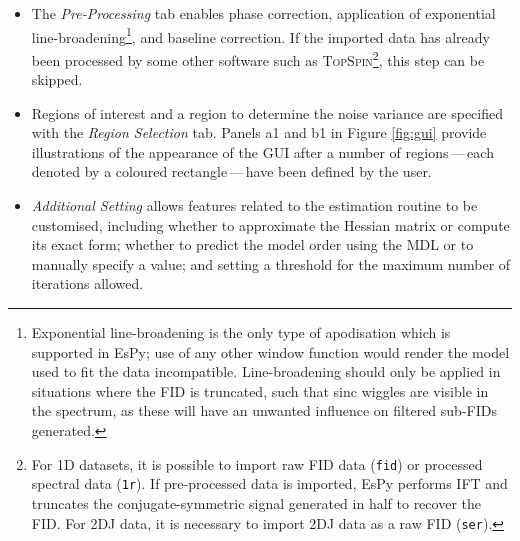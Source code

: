 \begin{itemize}
    \item The \emph{Pre-Processing} tab enables phase correction,
        application of exponential line-broadening\footnote{
            Exponential line-broadening is the only type of apodisation which
            is supported in \ac{EsPy}; use of any other window function
            would render the model used to fit the data incompatible.
            Line-broadening should only be applied in
            situations where the \ac{FID} is truncated, such that sinc wiggles
            are visible in the spectrum, as these will have an unwanted
            influence on filtered sub-\acp{FID} generated.
        }, and baseline correction. If the imported data has already been
        processed by some other software such as \textsc{TopSpin}\footnote{
            For \ac{1D} datasets, it is possible to import raw \ac{FID} data
            (\texttt{fid}) or processed spectral data (\texttt{1r}). If
            pre-processed data is imported, \ac{EsPy} performs \ac{IFT} and
            truncates the conjugate-symmetric signal generated in half to
            recover the \ac{FID}. For \ac{2DJ} data, it is necessary to import
            \ac{2DJ} data as a raw \ac{FID} (\texttt{ser}).
        }, this step can be skipped.
    \item Regions of interest and a region to determine the noise variance are
        specified with the \emph{Region Selection} tab. Panels a1 and b1 in
        Figure \ref{fig:gui} provide illustrations of the appearance of the
        \ac{GUI} after a number of regions\,---\,each denoted by a coloured
        rectangle\,---\,have been defined by the user.
    \item \emph{Additional Setting} allows features related to the estimation
        routine to be customised, including whether to approximate the Hessian
        matrix or compute its exact form; whether to predict the model order
        using the \ac{MDL} or to manually specify a value; and setting a
        threshold for the maximum number of iterations allowed.
\end{itemize}


